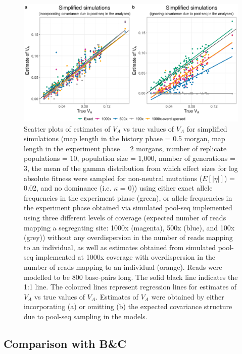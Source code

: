 \documentclass[12pt]{article}
\begin{document}
\begin{bibunit}
\newpage
\begin{figure}[H]
\centering
\includegraphics[scale = 0.15]{Figures/poolseq_simplified.jpg}
\caption{Scatter plots of estimates of $V_A$ vs true values of $V_A$ for simplified simulations (map length in the history phase = 0.5 morgan, map length in the experiment phase = 2 morgans, number of replicate populations = 10, population size = 1,000, number of generations = 3, the mean of the gamma distribution from which effect sizes for log absolute fitness were sampled for non-neutral mutations ($E[|\eta|]$) = 0.02, and no dominance (i.e. $\kappa$ = 0)) using either exact allele frequencies in the experiment phase (green), or allele frequencies in the experiment phase obtained via simulated pool-seq implemented using three different levels of coverage (expected number of reads mapping a segregating site: 1000x (magenta), 500x (blue), and 100x (grey)) without any overdispersion in the number of reads mapping to an individual, as well as estimates obtained from simulated pool-seq implemented at 1000x coverage with overdispersion in the number of reads mapping to an individual (orange). Reads were modelled to be 800 base-pairs long. The solid black line indicates the 1:1 line. The coloured lines represent regression lines for estimates of $V_A$ vs true values of $V_A$. Estimates of $V_A$ were obtained by either incorporating (a) or omitting (b) the expected covariance structure due to pool-seq sampling in the models.}
  \label{fig:poolseq_simplified}
\end{figure}

\subsection*{Comparison with B\&C}


\end{bibunit}
\end{document}
